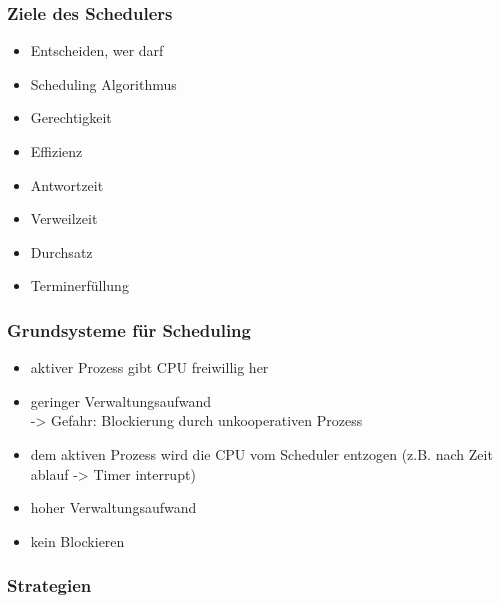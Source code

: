 \documentclass{article}
\begin{document}
\subsubsection{Ziele des Schedulers}

\begin{itemize}
    \item Entscheiden, wer  darf
    \item Scheduling Algorithmus
    \item Gerechtigkeit
    \item Effizienz
    \item Antwortzeit
    \item Verweilzeit
    \item Durchsatz
    \item Terminerfüllung
\end{itemize}

\subsubsection{Grundsysteme für Scheduling}

\begin{multicols}{2}
    \begin{itemize}
        \item aktiver Prozess gibt CPU freiwillig her
        \item geringer Verwaltungsaufwand \\
              \hspace*{1em} -> Gefahr: Blockierung durch
              \hspace*{2.5em} unkooperativen Prozess
    \end{itemize}
    \columnbreak

    \begin{itemize}
        \item dem aktiven Prozess wird die CPU vom Scheduler entzogen (z.B. nach Zeit ablauf -> Timer interrupt)
        \item hoher Verwaltungsaufwand
        \item kein Blockieren
    \end{itemize}
\end{multicols}

\subsubsection{Strategien}
\end{document}
